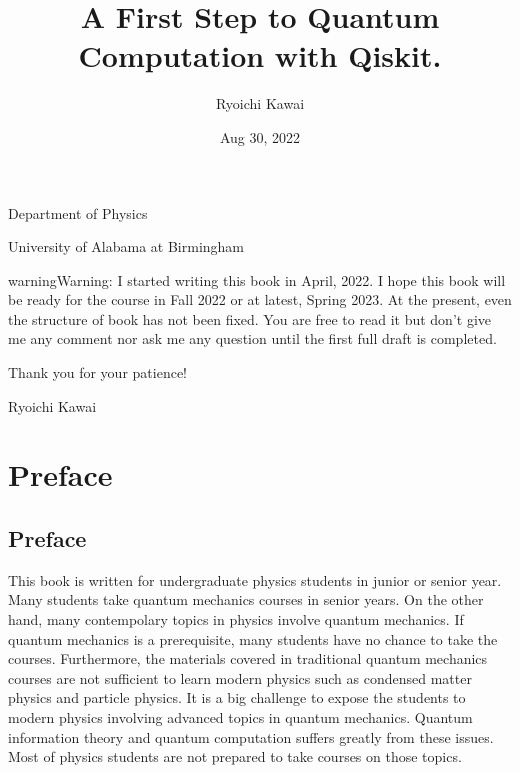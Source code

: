 \documentclass[letterpaper,10pt,english]{jupyterBook}
\title{A First Step to Quantum Computation with Qiskit.}
\date{Aug 30, 2022}
\author{Ryoichi Kawai}
\begin{document}
\pagestyle{empty}
\sphinxmaketitle
\pagestyle{plain}
\sphinxtableofcontents
\pagestyle{normal}
\label{\detokenize{cover::doc}}


\sphinxAtStartPar
{}

\sphinxAtStartPar
Department of Physics

\sphinxAtStartPar
University of Alabama at Birmingham

\sphinxAtStartPar
{}

\sphinxAtStartPar
{}

\begin{sphinxadmonition}{warning}{Warning:}
\sphinxAtStartPar
I started writing this book in April, 2022.   I hope this book will be ready for the course in Fall 2022 or at latest, Spring 2023.  At the present, even the structure of book has not been fixed. You are free to read it but don’t give me any comment nor ask me any question until the first full draft is completed.

\sphinxAtStartPar
Thank you for your patience!

\sphinxAtStartPar
Ryoichi Kawai
\end{sphinxadmonition}

\sphinxstepscope


\part{Preface}

\sphinxstepscope


\chapter{Preface}
\label{\detokenize{preface:preface}}\label{\detokenize{preface::doc}}
\sphinxAtStartPar
This book is written for undergraduate physics students in junior or senior year.  Many students take quantum mechanics courses in senior years.  On the other hand, many contempolary topics in physics involve quantum mechanics.  If quantum mechanics is a prerequisite, many students have no chance to take the courses. Furthermore, the materials covered in traditional quantum mechanics courses are not sufficient to learn modern physics such as condensed matter physics and particle physics. It is a big challenge to expose the students to modern physics involving advanced topics in quantum mechanics.
Quantum information theory and quantum computation suffers greatly from these issues.  Most of physics students are not prepared to take courses on those topics.
\end{document}
